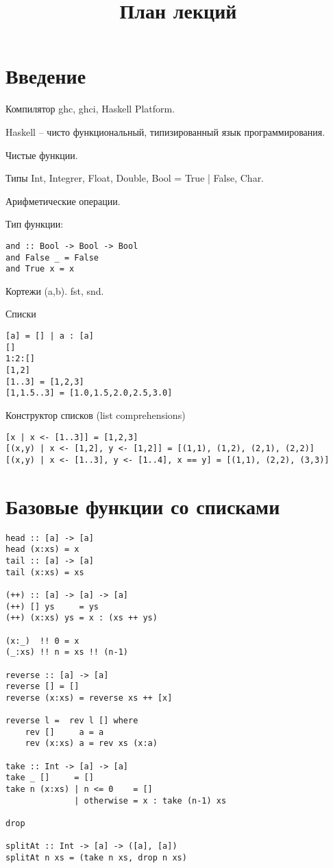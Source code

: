 \documentclass[a4paper,10pt]{article}
\begin{document}
\lstset{language=Haskell} 
\setcounter{secnumdepth}{0}
\title{План лекций}
\date{}
\maketitle

\section{Введение}
Компилятор ghc, ghci, Haskell Platform.

Haskell – чисто функциональный, типизированный язык программирования.

Чистые функции.

Типы Int, Integrer, Float, Double, Bool = True | False, Char.

Арифметические операции.

Тип функции:
\begin{lstlisting}
and :: Bool -> Bool -> Bool
and False _ = False
and True x = x
\end{lstlisting}

Кортежи (a,b).
fst, snd.

Списки
\begin{lstlisting}
[a] = [] | a : [a]
[]
1:2:[]
[1,2]
[1..3] = [1,2,3]
[1,1.5..3] = [1.0,1.5,2.0,2.5,3.0]
\end{lstlisting}

Конструктор списков (list comprehensions)
\begin{lstlisting}
[x | x <- [1..3]] = [1,2,3]
[(x,y) | x <- [1,2], y <- [1,2]] = [(1,1), (1,2), (2,1), (2,2)]
[(x,y) | x <- [1..3], y <- [1..4], x == y] = [(1,1), (2,2), (3,3)]
\end{lstlisting}

\section{Базовые функции со списками}
\begin{lstlisting}
head :: [a] -> [a]
head (x:xs) = x
tail :: [a] -> [a]
tail (x:xs) = xs

(++) :: [a] -> [a] -> [a]
(++) [] ys     = ys
(++) (x:xs) ys = x : (xs ++ ys)

(x:_)  !! 0 = x
(_:xs) !! n = xs !! (n-1)

reverse :: [a] -> [a]
reverse [] = []
reverse (x:xs) = reverse xs ++ [x]

reverse l =  rev l [] where
    rev []     a = a
    rev (x:xs) a = rev xs (x:a)

take :: Int -> [a] -> [a]
take _ []     = []
take n (x:xs) | n <= 0    = []
              | otherwise = x : take (n-1) xs

drop

splitAt :: Int -> [a] -> ([a], [a])
splitAt n xs = (take n xs, drop n xs)
\end{lstlisting}
\end{document}
